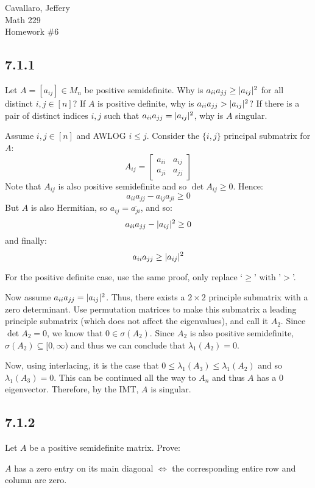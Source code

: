 \documentclass[letterpaper,12pt,fleqn]{article}
\renewcommand{\l}{\lambda}
\renewcommand{\o}{\sigma}
\begin{document}
Cavallaro, Jeffery \\
Math 229 \\
Homework \#6

\bigskip

\subsection*{7.1.1}

Let $A=[a_{ij}]\in M_n$ be positive semidefinite. Why is $a_{ii}a_{jj}\ge\lvert a_{ij}\rvert^2$
for all distinct $i,j\in[n]$? If $A$ is positive definite, why is
$a_{ii}a_{jj}>\lvert a_{ij}\rvert^2$? If there is a pair of distinct indices $i,j$ such that
$a_{ii}a_{jj}=\lvert a_{ij}\rvert^2$, why is $A$ singular.

Assume $i,j\in[n]$ and AWLOG $i\le j$. Consider the $\{i,j\}$ principal submatrix for
$A$:
\[A_{ij}=\begin{bmatrix} a_{ii} & a_{ij} \\ a_{ji} & a_{jj} \end{bmatrix}\]
Note that $A_{ij}$ is also positive semidefinite and so $\det A_{ij}\ge0$. Hence:
\[a_{ii}a_{jj}-a_{ij}a_{ji}\ge0\]
But $A$ is also Hermitian, so $a_{ij}=\overline{a_{ji}}$, and so:
\[a_{ii}a_{jj}-\lvert a_{ij}\rvert^2\ge0\]
and finally:
\[a_{ii}a_{jj}\ge\lvert a_{ij}\rvert^2\]

For the positive definite case, use the same proof, only replace `$\ge$' with '$>$'.

Now assume $a_{ii}a_{jj}=\lvert a_{ij}\rvert^2$. Thus, there exists a $2\times2$ principle
submatrix with a zero determinant. Use permutation matrices to make this submatrix
a leading principle submatrix (which does not affect the eigenvalues), and call it
$A_2$. Since $\det A_2=0$, we know that $0\in\o(A_2)$. Since $A_2$ is also positive
semidefinite, $\o(A_2)\subseteq[0,\infty)$ and thus we can conclude that $\l_1(A_2)=0$.

Now, using interlacing, it is the case that $0\le\l_1(A_3)\le\l_1(A_2)$ and so
$\l_1(A_3)=0$. This can be continued all the way to $A_n$ and thus $A$ has a 0
eigenvector.  Therefore, by the IMT, $A$ is singular.

\newpage

\subsection*{7.1.2}

Let $A$ be a positive semidefinite matrix. Prove:

$A$ has a zero entry on its main diagonal $\iff$ the corresponding entire row and
column are zero.
\end{document}
